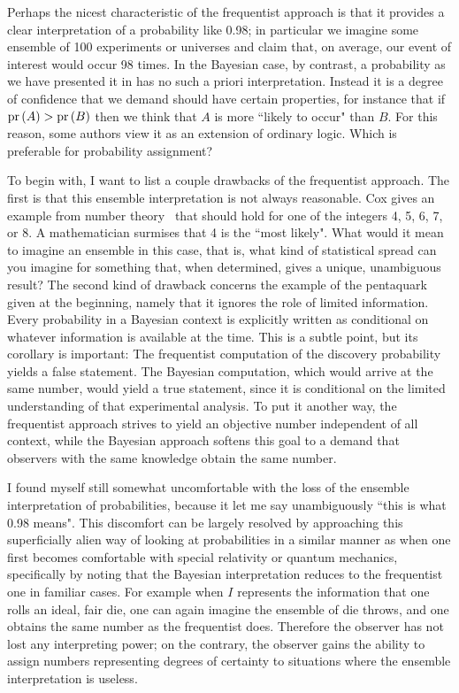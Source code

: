 Perhaps the nicest characteristic of the frequentist approach is that it
provides a clear interpretation of a probability like 0.98; in particular we
imagine some ensemble of 100 experiments or universes and claim that, on
average, our event of interest would occur 98 times. In the Bayesian case, by
contrast, a probability as we have presented it in
 has no such a priori interpretation. Instead it
is a degree of confidence that we demand should have certain properties, for
instance that if $\operatorname{pr}\left(A\right)>\operatorname{pr}\left(B\right)$ then we think that $A$ is more ``likely to
occur" than $B$. For this reason, some authors view it as an extension of
ordinary logic. Which is preferable for probability assignment?

To begin with, I want to list a couple drawbacks of the frequentist approach.
The first is that this ensemble interpretation is not always reasonable. Cox
gives an example from number theory~\cite{cox_probability_1946} that should hold
for one of the integers 4, 5, 6, 7, or 8. A mathematician surmises that
4 is the ``most likely". What would it mean to imagine an ensemble in this case,
that is, what kind of statistical spread can you imagine for something that,
when determined, gives a unique, unambiguous result?
The second kind of drawback concerns the example of the pentaquark given at the
beginning, namely that it ignores the role of limited information. Every
probability in a Bayesian context is explicitly written as conditional on
whatever information is available at the time. This is a subtle point, but its
corollary is important: The frequentist computation of the discovery probability 
yields a false statement. The Bayesian computation, which would arrive at the same 
number, would yield a true statement, since it is conditional on the limited
understanding of that experimental analysis. To put it another way, the
frequentist approach strives to yield an objective number independent of all
context, while the Bayesian approach softens this goal to a demand that
observers with the same knowledge obtain the same number.

I found myself still somewhat uncomfortable with the loss of the ensemble
interpretation of probabilities, because it let me say unambiguously ``this is
what 0.98 means". This discomfort can be largely resolved by approaching this
superficially alien way of looking at probabilities in a similar manner as when
one first becomes comfortable with special relativity or quantum mechanics,
specifically by noting that the Bayesian interpretation reduces to the
frequentist one in familiar cases. For example when $I$ represents the
information that one rolls an ideal, fair die, one can again imagine the
ensemble of die throws, and one obtains the same number as the frequentist does.
Therefore the observer has not lost any interpreting power; on the contrary, the 
observer gains the ability to assign numbers representing degrees of certainty to
situations where the ensemble interpretation is useless.


